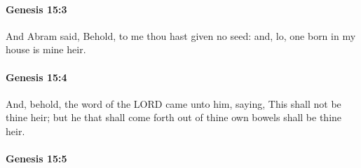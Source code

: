 
		\paragraph{Genesis 15:3} %
			\label{GENESIS-15-3}

			And Abram said, Behold, to me thou hast given no seed: and, lo, one born in my house is mine heir.


		\paragraph{Genesis 15:4} %
			\label{GENESIS-15-4}

			And, behold, the word of the LORD came unto him, saying, This shall not be thine heir; but he that shall come forth out of thine own bowels shall be thine heir.


		\paragraph{Genesis 15:5} %
			\label{GENESIS-15-5}

